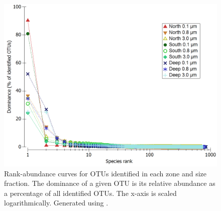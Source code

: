 \begin{figure}[!ht]
  \centering
  \includegraphics[width=\textwidth]{../polarfront/rankabundance.png}
  \caption[Rank-abundance curves for \acp{OTU} in each zone and size fraction]{Rank-abundance curves for \acp{OTU} identified in each zone and size fraction. The dominance of a given OTU is its relative abundance as a percentage of all identified \acp{OTU}. The x-axis is scaled logarithmically. Generated using .}
  \label{fig:rankabundance}
\end{figure}
